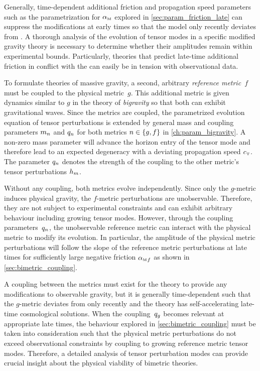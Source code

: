 \documentclass[12pt,parskip=half]{scrreprt}
\begin{document}
Generally, time-dependent additional friction and propagation speed parameters such as the parametrization for \({\alpha_{\textnormal{\tiny{M}}}}\) explored in \autoref{sec:param_friction_late} can suppress the modifications at early times so that the model only recently deviates from \LCDM. A thorough analysis of the evolution of tensor modes in a specific modified gravity theory is necessary to determine whether their amplitudes remain within experimental bounds. Particularly, theories that predict late-time additional friction in conflict with the  can easily be in tension with observational data.

To formulate theories of massive gravity, a second, arbitrary \emph{reference metric}~\(f\) must be coupled to the physical metric~\(g\). This additional metric is given dynamics similar to \(g\) in the theory of \emph{bigravity} so that both can exhibit gravitational waves. Since the metrics are coupled, the parametrized evolution equation of tensor perturbations is extended by general mass and coupling parameters \(m_{n}\) and \(q_{n}\) for both metrics \(n \in \cbr{g,f}\) in \autoref{ch:param_bigravity}. A non-zero mass parameter will advance the horizon entry of the tensor mode and therefore lead to an expected degeneracy with a deviating propagation speed \({c_{\textnormal{\tiny{T}}}}\). The parameter \(q_{n}\) denotes the strength of the coupling to the other metric's tensor perturbations \(h_{m}\).

Without any coupling, both metrics evolve independently. Since only the \(g\)-metric induces physical gravity, the \(f\)-metric perturbations are unobservable. Therefore, they are not subject to experimental constraints and can exhibit arbitrary behaviour including growing tensor modes. However, through the coupling parameters~\(q_{n}\), the unobservable reference metric can interact with the physical metric to modify its evolution. In particular, the amplitude of the physical metric perturbations will follow the slope of the reference metric perturbations at late times for sufficiently large negative friction \({\alpha_{\textnormal{\tiny{M}}}}_{f}\) as shown in \autoref{sec:bimetric_coupling}.

A coupling between the metrics must exist for the theory to provide any modifications to observable gravity, but it is generally time-dependent such that the \(g\)-metric deviates from \LCDM only recently and the theory has self-accelerating late-time cosmological solutions. When the coupling~\(q_{g}\) becomes relevant at appropriate late times, the behaviour explored in \autoref{sec:bimetric_coupling} must be taken into consideration such that the physical metric perturbations do not exceed observational constraints by coupling to growing reference metric tensor modes. Therefore, a detailed analysis of tensor perturbation modes can provide crucial insight about the physical viability of bimetric theories.
\end{document}
